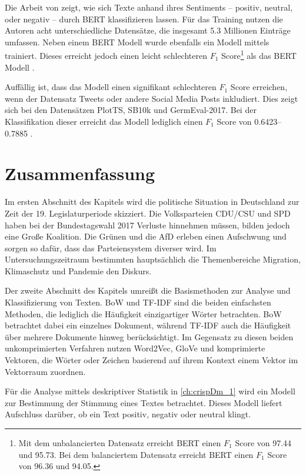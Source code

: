 Die Arbeit von \textcite{guhr_training_2020} zeigt, wie sich Texte anhand ihres Sentiments -- positiv, neutral, oder negativ -- durch \ac{BERT} klassifizieren lassen. Für das Training nutzen die Autoren acht unterschiedliche Datensätze, die insgesamt \num{5.3} Millionen Einträge umfassen. Neben einem \ac{BERT} Modell wurde ebenfalls ein Modell mittels \ft trainiert. Dieses erreicht jedoch einen leicht schlechteren $F_1$ Score\footnote{Mit dem unbalancierten Datensatz erreicht \ac{BERT} einen $F_1$ Score von \num{97.44} und \ft \num{95.73}. Bei dem balanciertem Datensatz erreicht \ac{BERT} einen $F_1$ Score von \num{96.36} und \ft \num{94.05}.} als das \ac{BERT} Modell \autocite[]{guhr_training_2020}.

Auffällig ist, dass das Modell einen signifikant schlechteren $F_1$ Score erreichen, wenn der Datensatz Tweets oder andere Social Media Posts inkludiert. Dies zeigt sich bei den Datensätzen PlotTS, SB10k und GermEval-2017. Bei der Klassifikation dieser erreicht das Modell lediglich einen $F_1$ Score von \numrange{0.6423}{0.7885} \autocite[1631]{guhr_training_2020}.

\section{Zusammenfassung}

Im ersten Abschnitt des Kapitels wird die politische Situation in Deutschland zur Zeit der \num{19}. Legislaturperiode skizziert. Die Volksparteien \ac{CDU}/\ac{CSU} und \ac{SPD} haben bei der Bundestagswahl \num{2017} Verluste hinnehmen müssen, bilden jedoch eine Große Koalition. Die Grünen und die \ac{AfD} erleben einen Aufschwung und sorgen so dafür, dass das Parteiensystem diverser wird. Im Untersuchungszeitraum bestimmten hauptsächlich die Themenbereiche Migration, Klimaschutz und Pandemie den Diskurs.

Der zweite Abschnitt des Kapitels umreißt die Basismethoden zur Analyse und Klassifizierung von Texten. \ac{BoW} und \ac{TF-IDF} sind die beiden einfachsten Methoden, die lediglich die Häufigkeit einzigartiger Wörter betrachten. \ac{BoW} betrachtet dabei ein einzelnes Dokument, während \ac{TF-IDF} auch die Häufigkeit über mehrere Dokumente hinweg berücksichtigt. Im Gegensatz zu diesen beiden unkomprimierten Verfahren nutzen Word2Vec, GloVe und \ft komprimierte Vektoren, die Wörter oder Zeichen basierend auf ihrem Kontext einem Vektor im Vektorraum zuordnen.

Für die Analyse mittels deskriptiver Statistik in \autoref{ch:crispDm_1} wird ein Modell zur Bestimmung der Stimmung eines Textes betrachtet. Dieses Modell liefert Aufschluss darüber, ob ein Text positiv, negativ oder neutral klingt.
